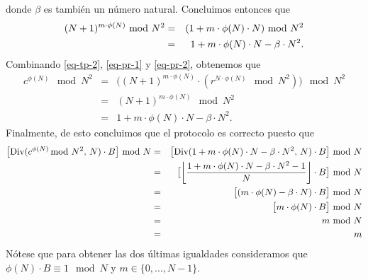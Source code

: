 \documentclass[11pt]{article}
\begin{document}
\begin{enumerate}
donde $\beta$ es también un número natural. Concluimos entonces que
\begin{eqnarray}
  \notag
  (N+1)^{m \cdot \phi(N)} \!\! \mod N^2 &=& (1 + m \cdot \phi(N) \cdot N) \!\! \mod N^2\\
\label{eq-pr-2}
  &=&  1 + m \cdot \phi(N) \cdot N - \beta \cdot N^2.
\end{eqnarray}
Combinando \eqref{eq-tp-2}, \eqref{eq-pr-1} y \eqref{eq-pr-2}, obtenemos que
  \begin{eqnarray*}
    c^{\phi(N)} \!\! \mod N^2 &=& \big((N+1)^{m \cdot \phi(N)} \cdot (r^{N \cdot \phi(N)} \!\! \mod N^2)\big) \!\! \mod N^2\\
    &=& (N+1)^{m \cdot \phi(N)} \!\! \mod N^2\\
    &=& 1 + m \cdot \phi(N) \cdot N - \beta \cdot N^2.
  \end{eqnarray*}
Finalmente, de esto concluimos que el protocolo es correcto puesto que
  \begin{eqnarray*}
    \big[\dv(c^{\phi(N)} \!\!\!\mod N^2,\, N)  \cdot B \big] \!\!\mod N &=&
    \big[\dv(1 + m \cdot \phi(N) \cdot N - \beta \cdot N^2,\, N)  \cdot B \big] \!\!\mod N\\
    &=& \big[\bigg\lfloor \frac{1 + m \cdot \phi(N) \cdot N - \beta \cdot N^2 -1}{N} \bigg\rfloor \cdot B\big] \!\!\mod N\\
    &=& \big[(m \cdot \phi(N) - \beta \cdot N) \cdot B\big] \!\!\mod N\\
    &=& \big[m \cdot \phi(N) \cdot B\big] \!\!\mod N\\
    &=& m \!\!\mod N\\
    &=& m
  \end{eqnarray*}
  Nótese que para obtener las dos últimas igualdades consideramos que $\phi(N) \cdot B \equiv 1  \mod N$ y $m \in \{0, \ldots, N-1\}$.

  

\end{enumerate}


  
\end{document}

